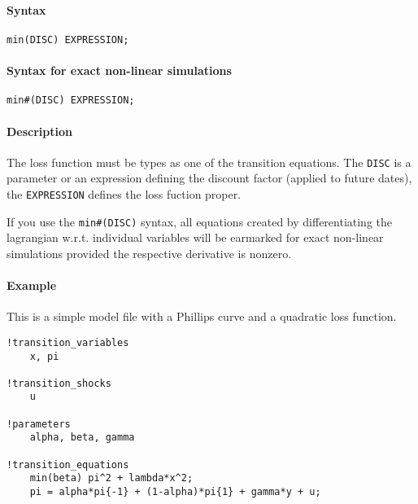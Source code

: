 


	\paragraph{Syntax}

\begin{verbatim}
min(DISC) EXPRESSION;
\end{verbatim}

\paragraph{Syntax for exact non-linear
simulations}

\begin{verbatim}
min#(DISC) EXPRESSION;
\end{verbatim}

\paragraph{Description}

The loss function must be types as one of the transition equations. The
\texttt{DISC} is a parameter or an expression defining the discount
factor (applied to future dates), the \texttt{EXPRESSION} defines the
loss fuction proper.

If you use the \texttt{min\#(DISC)} syntax, all equations created by
differentiating the lagrangian w.r.t. individual variables will be
earmarked for exact non-linear simulations provided the respective
derivative is nonzero.

\paragraph{Example}

This is a simple model file with a Phillips curve and a quadratic loss
function.

\begin{verbatim}
!transition_variables
    x, pi

!transition_shocks
    u

!parameters
    alpha, beta, gamma

!transition_equations
    min(beta) pi^2 + lambda*x^2;
    pi = alpha*pi{-1} + (1-alpha)*pi{1} + gamma*y + u;
\end{verbatim}


